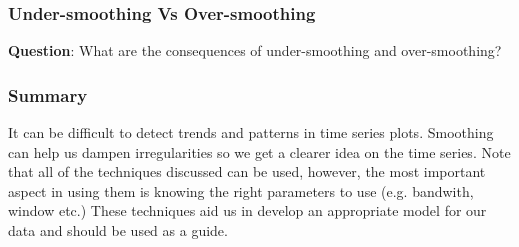 \documentclass[%
xcolor=pdftex]{beamer}
\begin{document}
\begin{frame}
\frametitle{Under-smoothing Vs Over-smoothing}

\textbf{Question}: What are the consequences of under-smoothing and over-smoothing?

\end{frame}

\begin{frame}
\frametitle{Summary}

It can be difficult to detect trends and patterns in time series plots. Smoothing can help us dampen irregularities so we get a clearer idea on the time series. Note that all of the techniques discussed can be used, however, the most important aspect in using them is knowing the right parameters to use (e.g. bandwith, window etc.) These techniques aid us in develop an appropriate model for our data and should be used as a guide.

\end{frame}
\end{document}
